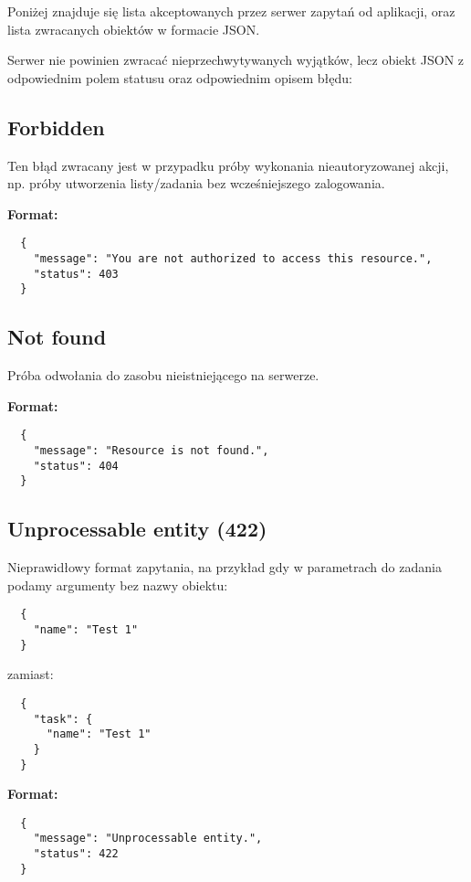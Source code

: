 Poniżej znajduje się lista akceptowanych przez serwer zapytań od aplikacji, oraz lista zwracanych obiektów w formacie JSON.

Serwer nie powinien zwracać nieprzechwytywanych wyjątków, lecz obiekt JSON z odpowiednim polem statusu oraz odpowiednim opisem błędu:

\subsection{ Forbidden}

Ten błąd zwracany jest w przypadku próby wykonania nieautoryzowanej akcji, np. próby utworzenia listy/zadania bez wcześniejszego zalogowania.

\textbf{Format:}

\begin{lstlisting}
  {
    "message": "You are not authorized to access this resource.",
    "status": 403
  }
\end{lstlisting}

\subsection{ Not found}

Próba odwołania do zasobu nieistniejącego na serwerze.

\textbf{Format:}

\begin{lstlisting}
  {
    "message": "Resource is not found.",
    "status": 404
  }
\end{lstlisting}

\subsection{ Unprocessable entity (422)}

Nieprawidłowy format zapytania, na przykład gdy w parametrach do zadania podamy argumenty bez nazwy obiektu:

\begin{lstlisting}
  {
    "name": "Test 1"
  }
\end{lstlisting}

zamiast:

\begin{lstlisting}
  {
    "task": {
      "name": "Test 1"
    }
  }
\end{lstlisting}

\textbf{Format:}

\begin{lstlisting}
  {
    "message": "Unprocessable entity.",
    "status": 422
  }
\end{lstlisting}

